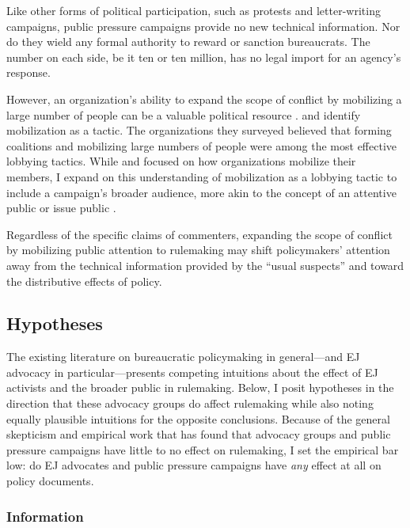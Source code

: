 \documentclass[
      12pt,
        ]{article}
\begin{document}
Like other forms of political participation, such as protests and letter-writing campaigns,
public pressure campaigns provide no new technical information.
Nor do they wield any formal authority to reward or sanction bureaucrats.
The number on each side, be it ten or ten million, has no legal import for an agency's response.

However, an organization's ability to expand the scope of conflict by mobilizing
a large number of people can be a valuable political resource \citep{Schattschneider1975}. \citet{Furlong1997} and \citet{Kerwin2011}
identify mobilization as a tactic. The organizations they surveyed
believed that forming coalitions and mobilizing large numbers of people
were among the most effective lobbying tactics. While \citet{Furlong1997} and \citet{Kerwin2011} focused on how
organizations mobilize their members, I expand on this understanding of mobilization as a lobbying tactic to include a campaign's broader audience, more akin to the concept of
an attentive public \citep{Key1961} or issue public \citep{Converse1964}.

Regardless of the specific claims of commenters, expanding the scope of conflict by mobilizing public attention to rulemaking may shift policymakers' attention away from the technical information provided by the ``usual suspects'' and toward the distributive effects of policy.

\hypertarget{hypotheses}{%
\subsection{Hypotheses}\label{hypotheses}}

The existing literature on bureaucratic policymaking in general---and EJ advocacy in particular---presents competing intuitions about the effect of EJ activists and the broader public in rulemaking. Below, I posit hypotheses in the direction that these advocacy groups do affect rulemaking while also noting equally plausible intuitions for the opposite conclusions. Because of the general skepticism and empirical work that has found that advocacy groups and public pressure campaigns have little to no effect on rulemaking, I set the empirical bar low: do EJ advocates and public pressure campaigns have \emph{any} effect at all on policy documents.

\hypertarget{information}{%
\subsubsection{Information}\label{information}}
\end{document}
